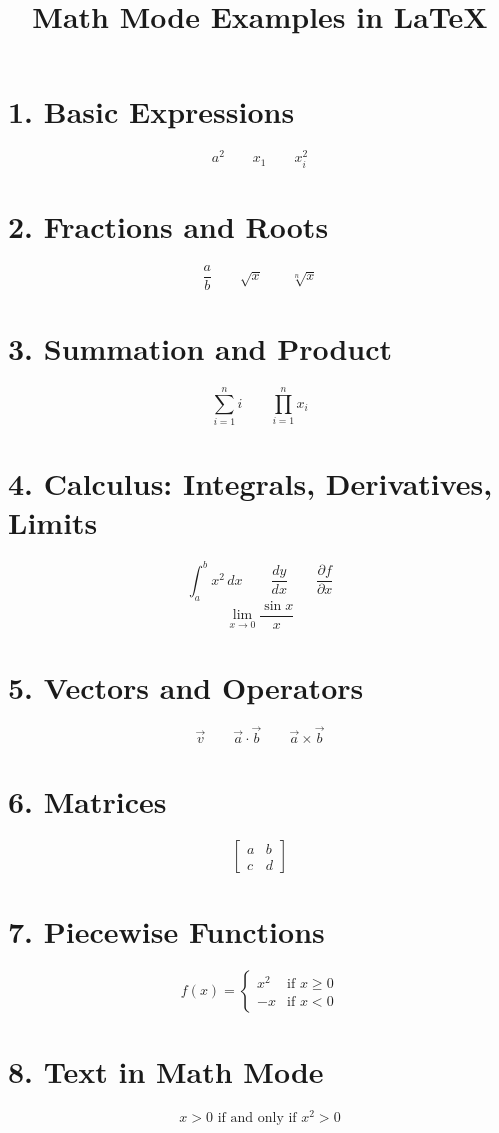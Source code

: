 \documentclass{article}
\title{Math Mode Examples in LaTeX}
\date{}
\begin{document}
\maketitle

\section*{1. Basic Expressions}

\[
a^2 \qquad x_1 \qquad x_i^2
\]

\section*{2. Fractions and Roots}

\[
\frac{a}{b} \qquad \sqrt{x} \qquad \sqrt[n]{x}
\]

\section*{3. Summation and Product}

\[
\sum_{i=1}^{n} i \qquad \prod_{i=1}^{n} x_i
\]

\section*{4. Calculus: Integrals, Derivatives, Limits}

\[
\int_{a}^{b} x^2 \, dx \qquad \frac{dy}{dx} \qquad \frac{\partial f}{\partial x}
\]
\[
\lim_{x \to 0} \frac{\sin x}{x}
\]

\section*{5. Vectors and Operators}

\[
\vec{v} \qquad \vec{a} \cdot \vec{b} \qquad \vec{a} \times \vec{b}
\]

\section*{6. Matrices}

\[
\begin{bmatrix}
a & b \\
c & d
\end{bmatrix}
\]

\section*{7. Piecewise Functions}

\[
f(x) = 
\begin{cases}
x^2 & \text{if } x \ge 0 \\
-x  & \text{if } x < 0
\end{cases}
\]

\section*{8. Text in Math Mode}

\[
x > 0 \text{ if and only if } x^2 > 0
\]
\end{document}
